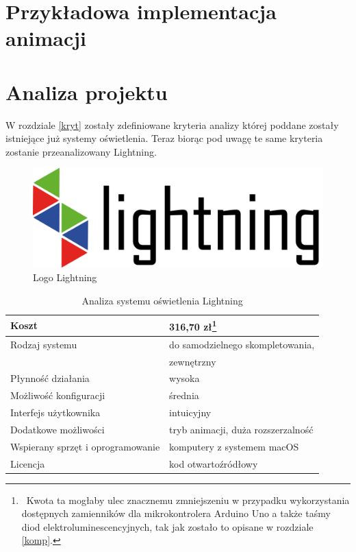 \documentclass[12pt]{report}
\begin{document}

\section{Przykładowa implementacja animacji}


\section{Analiza projektu}

W rozdziale \ref{kryt} zostały zdefiniowane kryteria analizy której poddane zostały istnie\-jące już systemy oświetlenia. Teraz biorąc pod uwagę te same kryteria zostanie przeanalizowany Lightning.

\begin{figure}[h]
\centering
\includegraphics[width=\textwidth]{../resources/logo.png}
\caption{Logo Lightning}
\end{figure}

\begin{table}[h]
\centering
\begin{tabular}{| l | l |} 
\hline 
Koszt & 316,70 zł\footnote{~Kwota ta mogłaby ulec znacznemu zmniejszeniu w przypadku wykorzystania dostępnych zamienników dla mikrokontrolera Arduino Uno a także taśmy diod elektroluminescencyjnych, tak jak zostało to opisane w rozdziale \ref{komp}.}\\ \hline
Rodzaj systemu & do samodzielnego skompletowania, \\ \hline
& zewnętrzny \\ \hline
Płynność działania & wysoka \\ \hline
Możliwość konfiguracji & średnia  \\ \hline
Interfejs użytkownika & intuicyjny  \\ \hline
Dodatkowe możliwości &  tryb animacji, duża rozszerzalność \\ \hline
Wspierany sprzęt i oprogramowanie &  komputery z systemem macOS  \\ \hline
Licencja & kod otwartoźródłowy  \\ \hline
\end{tabular} 
\caption{Analiza systemu oświetlenia Lightning}
\end{table}
\end{document}
